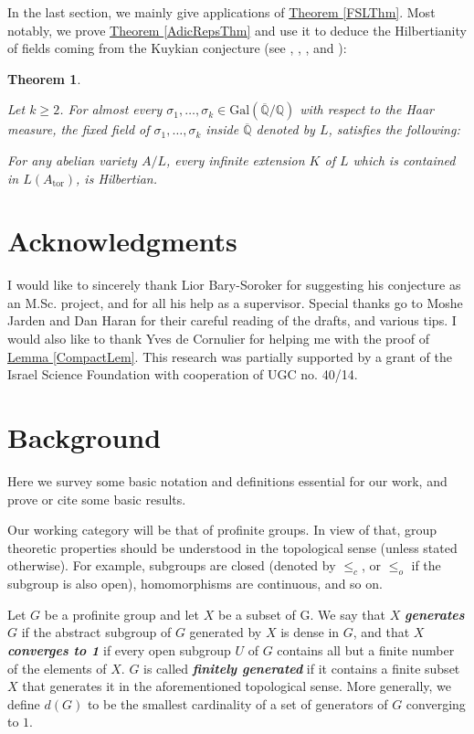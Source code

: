 \documentclass[12pt,a4paper]{article}
\newtheorem{theorem}{Theorem}[section]
\newcommand{\lemref}[1]{\hyperref[#1]{Lemma \ref*{#1}}}
\newcommand{\thmref}[1]{\hyperref[#1]{Theorem \ref*{#1}}}
\begin{document}
In the last section, we mainly give applications of \thmref{FSLThm}. Most notably, we prove \thmref{AdicRepsThm} and use it to deduce the Hilbertianity of fields coming from the Kuykian conjecture (see \cite[Theorem 1.3]{BFW}, \cite{FP}, \cite{FJP}, and \cite{Ja10}):

\begin{theorem} \label{AlmostThm}

Let $k \geq 2$. For almost every $\sigma_1, \dots, \sigma_k \in \mathrm{Gal}(\overline{\mathbb{Q}}/\mathbb{Q})$ with respect to the Haar measure, the fixed field of $\sigma_1, \dots, \sigma_k$ inside $\overline{\mathbb{Q}}$ denoted by $L$, satisfies the following: 

For any abelian variety $A/L$, every infinite extension $K$ of $L$ which is contained in $L(A_{\mathrm{tor}})$, is Hilbertian.

\end{theorem}

\section*{Acknowledgments} I would like to sincerely thank Lior Bary-Soroker for suggesting his conjecture as an M.Sc. project, and for all his help as a supervisor. Special thanks go to Moshe Jarden and Dan Haran for their careful reading of the drafts, and various tips. I would also like to thank Yves de Cornulier for helping me with the proof of \lemref{CompactLem}. This research was partially supported by a grant of the Israel Science Foundation with cooperation of UGC no. 40/14.



\section{Background}

Here we survey some basic notation and definitions essential for our work, and prove or cite some basic results.

Our working category will be that of profinite groups. In view of that, group theoretic properties should be understood in the topological sense (unless stated otherwise). For example, subgroups are closed (denoted by $\leq_c$, or $\leq_o$ if the subgroup is also open), homomorphisms are continuous, and so on.

Let $G$ be a profinite group and let $X$ be a subset of G. We say that $X$ \textit{\textbf{generates}} $G$ if the abstract subgroup of $G$ generated by $X$ is dense in $G$, and that $X$ \textbf{\textit{converges to 1}} if every open subgroup $U$ of $G$ contains all but a finite number of the elements of $X$. $G$ is called \textbf{\textit{finitely generated}} if it contains a finite subset $X$ that generates it in the aforementioned topological sense. More generally, we define $d(G)$ to be the smallest cardinality of a set of generators of $G$ converging to $1$. 
\end{document}
